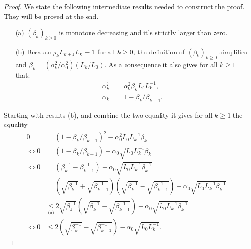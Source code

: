 \documentclass[12pt]{report}
\begin{document}
        \begin{proof}
            We state the following intermediate results needed to construct the proof. 
            They will be proved at the end. 
            \begin{enumerate}
                \item[(a)] $(\beta_k)_{k \ge 0}$ is monotone decreasing and it's strictly larger than zero. 
                \item[(b)] Because $\rho_{k}L_{k + 1}L_k = 1$ for all $k \ge 0$, the definition of $(\beta_k)_{k\ge 0}$ simplifies and $\beta_k = (\alpha_k^2/\alpha_0^2)(L_k/L_0)$. As a consequence it also gives for all $k \ge 1$ that: 
                \begin{align*}
                    \alpha_k^2 &= \alpha_0^2\beta_kL_0L_k^{-1},
                    \\
                    \alpha_k &= 1 - \beta_k / \beta_{k - 1}. 
                \end{align*}
            \end{enumerate}
            Starting with results (b), and combine the two equality it gives for all $k \ge 1$ the equality 
            \begin{align*}
                0 &=
                (1 - \beta_k/\beta_{k - 1})^2 - \alpha_0^2L_0L_k^{-1}\beta_k 
                \\
                \iff 
                0 &= 
                (1 - \beta_k/\beta_{k - 1}) - \alpha_0\sqrt{L_0L_k^{-1}\beta_k}
                \\
                \iff 
                0 &= 
                (\beta_k^{-1} - \beta_{k - 1}^{-1}) - \alpha_0 \sqrt{L_0 L_k^{-1}\beta_k^{-1}}
                \\
                &= \left(
                    \sqrt{\beta_k^{-1}} + \sqrt{\beta_{k - 1}^{-1}}
                \right)\left(
                    \sqrt{\beta_k^{-1}} - \sqrt{\beta_{k - 1}^{-1}}
                \right)
                - \alpha_0 \sqrt{L_0L_k^{-1}\beta_k^{-1}}
                \\
                &\underset{\text{(a)}}{\le} 
                2\sqrt{\beta_k^{-1}}\left(
                    \sqrt{\beta_k^{-1}} - \sqrt{\beta_{k - 1}^{-1}}
                \right) - \alpha_0 \sqrt{L_0L_k^{-1}\beta_k^{-1}}
                \\
                \iff
                0 &\le 
                2\left(
                    \sqrt{\beta_k^{-1}} - \sqrt{\beta_{k - 1}^{-1}} 
                \right) - \alpha_0 \sqrt{L_0L_k^{-1}}. 

\end{align*}
\end{proof}
\end{document}
